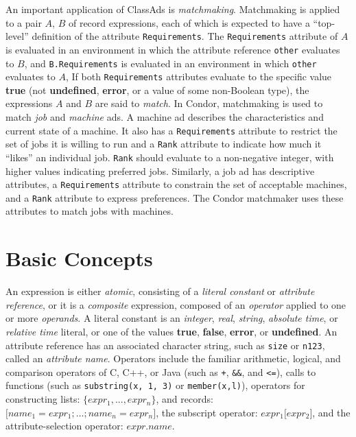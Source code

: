 \documentclass{article}
\begin{document}
An important application of ClassAds is \emph{matchmaking}.  Matchmaking is
applied to a pair $A$, $B$ of record expressions, each of which is expected to
have a ``top-level'' definition of the attribute \texttt{Requirements}.  The
\texttt{Requirements} attribute of $A$ is evaluated in an
environment in which the attribute reference \texttt{other} evaluates to $B$,
and \texttt{B.Requirements} is evaluated in an environment in which
\texttt{other} evaluates to $A$,
If both \texttt{Requirements} attributes evaluate to the specific value
\textbf{true} (not \textbf{undefined}, \textbf{error}, or a value of some
non-Boolean type), the expressions $A$ and $B$ are said to \emph{match}.  In
Condor, matchmaking is used to match \emph{job} and \emph{machine} ads.  A
machine ad describes the characteristics and current state of a machine.  It
also has a \texttt{Requirements} attribute to restrict the set of jobs it is
willing to run and a \texttt{Rank} attribute to indicate how much it ``likes''
an individual job.  \texttt{Rank} should evaluate to a non-negative integer,
with higher values indicating preferred jobs.  Similarly, a job ad has
descriptive attributes, a \texttt{Requirements} attribute to constrain the set
of acceptable machines, and a \texttt{Rank} attribute to express preferences.
The Condor matchmaker uses these attributes to match jobs with machines.

\section{Basic Concepts}

An expression is either \emph{atomic}, consisting of a \emph{literal constant}
or \emph{attribute reference}, or it is a \emph{composite} expression, composed
of an \emph{operator} applied to one or more \emph{operands}.  A literal
constant is an
\emph{integer},
\emph{real},
\emph{string},
\emph{absolute time},
or \emph{relative time} literal,
or one of the values
\textbf{true},
\textbf{false},
\textbf{error}, or
\textbf{undefined}.
An attribute reference has an associated character string,
such as \texttt{size} or \texttt{n123}, called an \emph{attribute name}.
Operators include the familiar arithmetic, logical, and comparison operators of
C, C++, or Java (such as \texttt{+}, \texttt{\&\&}, and \texttt{<=}), calls to
functions (such as \texttt{substring(x, 1, 3)} or \texttt{member(x,l)}),
operators for constructing lists:
$\mathtt{\{}expr_1 , ... , expr_n \mathtt{\}}$,
and
records: $\mathtt{[} name_1 = expr_1 ; ... ; name_n = expr_n \mathtt{]}$, the
subscript operator: $expr_1 \mathtt{[} expr_2 \mathtt{]}$, and the
attribute-selection operator: $expr . name$.
\end{document}
